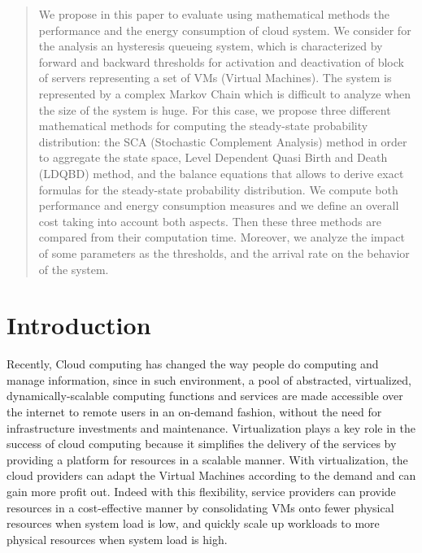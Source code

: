 \documentclass[conference]{IEEEtran}
\begin{document}
\begin{abstract}
We propose in this paper to evaluate using mathematical methods the performance and the energy consumption of cloud system. 
We consider for the analysis an hysteresis queueing system, which is characterized by forward and backward thresholds for 
activation and deactivation of block of servers representing a set of VMs (Virtual Machines).  
The system is represented by a complex Markov Chain which is difficult to analyze when the size of the system is huge.
For this case, we propose three different mathematical methods for computing the steady-state probability distribution: 
the SCA (Stochastic Complement Analysis) method in order to aggregate 
the state space, Level Dependent Quasi Birth and Death (LDQBD) method, and the balance equations that allows to derive exact formulas 
for the steady-state probability distribution. 
We compute both performance and energy consumption measures and we define an overall cost taking into account both aspects. 
Then these three methods are compared from their computation time. Moreover, we analyze the impact of some parameters  
as the thresholds, and the arrival rate on the behavior of the system. 
\end{abstract}


\section{Introduction}

Recently, Cloud computing has changed the way people do computing and manage information, since in such environment, 
a pool of abstracted, virtualized, dynamically-scalable computing functions and services are made accessible over the internet 
to remote users in an on-demand fashion, without the need for infrastructure investments and maintenance. 
Virtualization plays a key role in the success of cloud computing because it simplifies the delivery of the services by providing a platform for
resources in a scalable manner.  With virtualization, the cloud providers can adapt the Virtual Machines 
according to the demand and can gain more profit out. Indeed with this flexibility, service providers can  provide resources in 
a cost-effective manner by consolidating VMs onto fewer physical resources when system load is low,
and quickly scale up workloads to more physical resources when system load is high.
\end{document}
